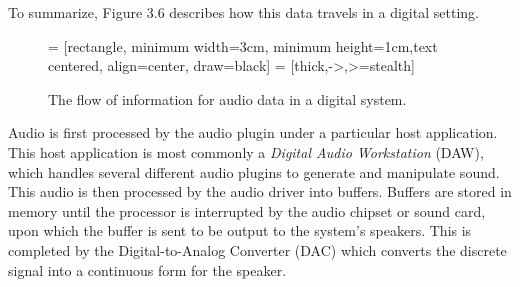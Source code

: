 To summarize, Figure 3.6 describes how this data travels in a digital setting.

\begin{figure}[h] %
	 = [rectangle, minimum width=3cm, minimum height=1cm,text centered, align=center, draw=black]
	 = [thick,->,>=stealth]
	\begin{center}
		\caption{The flow of information for audio data in a digital system.}
	\end{center}
\end{figure}

Audio is first processed by the audio plugin under a particular host application. This host application is most commonly a \textit{Digital Audio Workstation} (DAW), which handles several different audio plugins to generate and manipulate sound. This audio is then processed by the audio driver into buffers. Buffers are stored in memory until the processor is interrupted by the audio chipset or sound card, upon which the buffer is sent to be output to the system's speakers. This is completed by the Digital-to-Analog Converter (DAC) which converts the discrete signal into a continuous form for the speaker.

